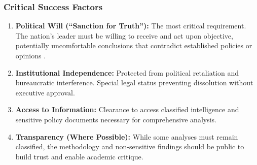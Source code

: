 \documentclass[11pt,a4paper]{article}
\begin{document}
\subsubsection{Critical Success Factors}
\begin{enumerate}[nosep]
    \item \textbf{Political Will (``Sanction for Truth''):} The most critical requirement. The nation's leader must be willing to receive and act upon objective, potentially uncomfortable conclusions that contradict established policies or opinions \citep[lines 1180, 1224--1225]{AnalyticalReport2025}.
    
    \item \textbf{Institutional Independence:} Protected from political retaliation and bureaucratic interference. Special legal status preventing dissolution without executive approval.
    
    \item \textbf{Access to Information:} Clearance to access classified intelligence and sensitive policy documents necessary for comprehensive analysis.
    
    \item \textbf{Transparency (Where Possible):} While some analyses must remain classified, the methodology and non-sensitive findings should be public to build trust and enable academic critique.
\end{enumerate}
\end{document}
